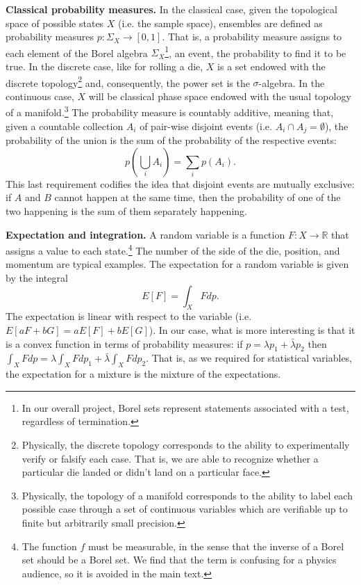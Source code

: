 \documentclass[10pt,twocolumn, nofootinbib]{revtex4-2}
\begin{document}
\textbf{Classical probability measures.} In the classical case, given the topological space of possible states $X$ (i.e. the sample space), ensembles are defined as probability measures $p : \Sigma_X \to [0,1]$. That is, a probability measure assigns to each element of the Borel algebra $\Sigma_X$\footnote{In our overall project, Borel sets represent statements associated with a test, regardless of termination.}, an event, the probability to find it to be true. In the discrete case, like for rolling a die, $X$ is a set endowed with the discrete topology\footnote{Physically, the discrete topology corresponds to the ability to experimentally verify or falsify each case. That is, we are able to recognize whether a particular die landed or didn't land on a particular face.} and, consequently, the power set is the $\sigma$-algebra. In the continuous case, $X$ will be classical phase space endowed with the usual topology of a manifold.\footnote{Physically, the topology of a manifold corresponds to the ability to label each possible case through a set of continuous variables which are verifiable up to finite but arbitrarily small precision.}  The probability measure is countably additive, meaning that, given a countable collection $A_i$ of pair-wise disjoint events (i.e. $A_i \cap A_j = \emptyset$), the probability of the union is the sum of the probability of the respective events:
\begin{equation}
	p\left(\bigcup_i A_i \right) = \sum_i p(A_i).
\end{equation}
This last requirement codifies the idea that disjoint events are mutually exclusive: if $A$ and $B$ cannot happen at the same time, then the probability of one of the two happening is the sum of them separately happening.

\textbf{Expectation and integration.} A random variable is a function $F : X \to \mathbb{R}$ that assigns a value to each state.\footnote{The function $f$ must be measurable, in the sense that the inverse of a Borel set should be a Borel set. We find that the term is confusing for a physics audience, so it is avoided in the main text.} The number of the side of the die, position, and momentum are typical examples. The expectation for a random variable is given by the integral
\begin{equation}
	E[F] = \int_X F dp.
\end{equation}
The expectation is linear with respect to the variable (i.e. $E[aF+bG]= aE[F]+bE[G]$). In our case, what is more interesting is that it is a convex function in terms of probability measures: if $p = \lambda p_1 + \bar{\lambda} p_2$ then $\int_X F dp = \lambda \int_X F dp_1 + \bar{\lambda} \int_X F dp_2$. That is, as we required for statistical variables, the expectation for a mixture is the mixture of the expectations.
\end{document}
